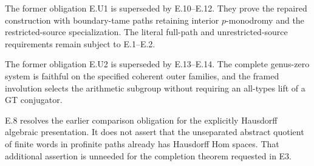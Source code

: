 



The former obligation E.U1 is superseded by E.10--E.12.
They prove the repaired construction with boundary-tame paths
retaining interior $p$-monodromy and the restricted-source
specialization. The literal full-path and unrestricted-source
requirements remain subject to E.1--E.2.





The former obligation E.U2 is superseded by E.13--E.14.
The complete genus-zero system is faithful on the specified coherent
outer families, and the framed involution selects the arithmetic
subgroup without requiring an all-types lift of a GT conjugator.

E.8 resolves the earlier comparison obligation for the explicitly
Hausdorff algebraic presentation. It does not assert that the
unseparated abstract quotient of finite words in profinite paths
already has Hausdorff Hom spaces. That additional assertion is
unneeded for the completion theorem requested in E3.
